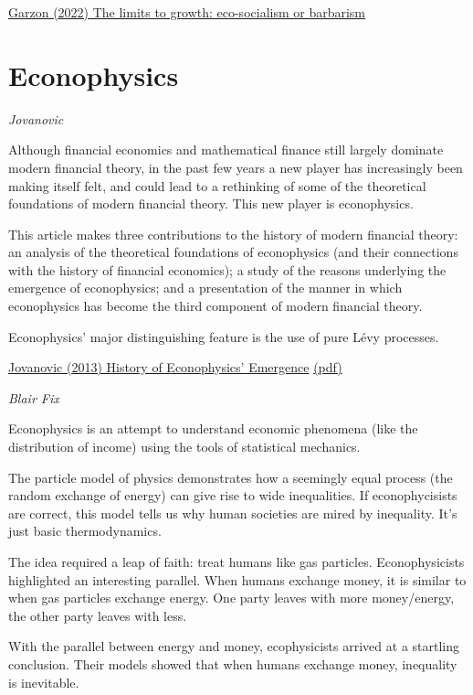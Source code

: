 \documentclass[
]{book}
\begin{document}
\href{https://la-u.org/the-limits-to-growth-eco-socialism-or-barbarism/}{Garzon (2022) The limits to growth: eco-socialism or barbarism}

\hypertarget{econophysics}{%
\chapter{Econophysics}\label{econophysics}}

\emph{Jovanovic}

Although financial
economics and mathematical finance still largely dominate modern financial
theory, in the past few years a new player has increasingly been making itself
felt, and could lead to a rethinking of some of the theoretical foundations of
modern financial theory. This new player is econophysics.

This article makes three contributions to the history of
modern financial theory: an analysis of the theoretical foundations of
econophysics (and their connections with the history of financial economics); a
study of the reasons underlying the emergence of econophysics; and a
presentation of the manner in which econophysics has become the third
component of modern financial theory.

Econophysics' major distinguishing feature is the use of pure Lévy processes.

\href{https://papers.ssrn.com/sol3/papers.cfm?abstract_id=3294565}{Jovanovic (2013) History of Econophysics' Emergence}
\href{pdf/Jovanovic_2013_Econophysics_History.pdf}{(pdf)}

\emph{Blair Fix}

Econophysics is an attempt to understand economic phenomena
(like the distribution of income)
using the tools of statistical mechanics.

The particle model of physics demonstrates how a seemingly equal process
(the random exchange of energy)
can give rise to wide inequalities.
If econophycisists are correct,
this model tells us why human societies are mired by inequality.
It's just basic thermodynamics.

The idea required a leap of faith: treat humans like gas particles.
Econophysicists highlighted an interesting parallel.
When humans exchange money, it is similar to when gas particles exchange energy.
One party leaves with more money/energy, the other party leaves with less.

With the parallel between energy and money, ecophysicists arrived at a startling conclusion.
Their models showed that when humans exchange money, inequality is inevitable.
\end{document}
